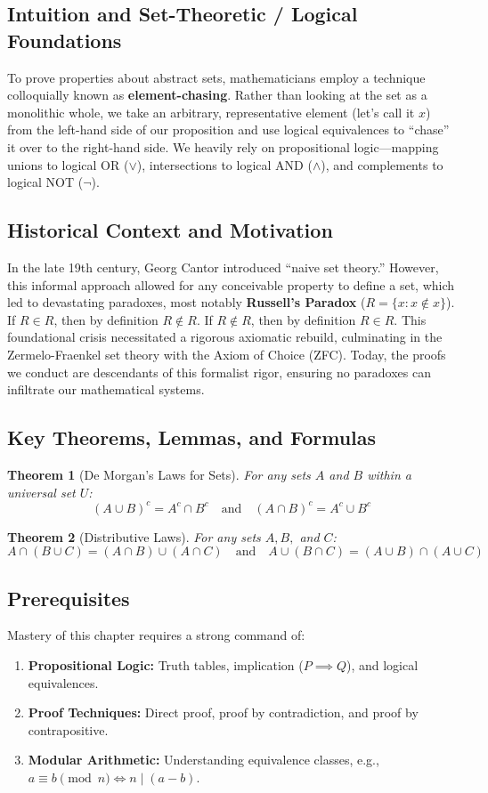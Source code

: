 \documentclass[11pt]{article}
\newtheorem{theorem}{Theorem}[section]
\begin{document}
\subsection{Intuition and Set-Theoretic / Logical Foundations}
To prove properties about abstract sets, mathematicians employ a technique colloquially known as \textbf{element-chasing}. Rather than looking at the set as a monolithic whole, we take an arbitrary, representative element (let's call it $x$) from the left-hand side of our proposition and use logical equivalences to ``chase'' it over to the right-hand side. We heavily rely on propositional logic—mapping unions to logical OR ($\lor$), intersections to logical AND ($\land$), and complements to logical NOT ($\neg$).

\subsection{Historical Context and Motivation}
In the late 19th century, Georg Cantor introduced ``naive set theory.'' However, this informal approach allowed for any conceivable property to define a set, which led to devastating paradoxes, most notably \textbf{Russell's Paradox} ($R = \{x : x \notin x\}$). If $R \in R$, then by definition $R \notin R$. If $R \notin R$, then by definition $R \in R$. This foundational crisis necessitated a rigorous axiomatic rebuild, culminating in the Zermelo-Fraenkel set theory with the Axiom of Choice (ZFC). Today, the proofs we conduct are descendants of this formalist rigor, ensuring no paradoxes can infiltrate our mathematical systems.

\subsection{Key Theorems, Lemmas, and Formulas}
\begin{theorem}[De Morgan's Laws for Sets]
For any sets $A$ and $B$ within a universal set $U$:
\[ (A \cup B)^c = A^c \cap B^c \quad \text{and} \quad (A \cap B)^c = A^c \cup B^c \]
\end{theorem}
\begin{theorem}[Distributive Laws]
For any sets $A, B,$ and $C$:
\[ A \cap (B \cup C) = (A \cap B) \cup (A \cap C) \quad \text{and} \quad A \cup (B \cap C) = (A \cup B) \cap (A \cup C) \]
\end{theorem}

\subsection{Prerequisites}
Mastery of this chapter requires a strong command of:
\begin{enumerate}
    \item \textbf{Propositional Logic:} Truth tables, implication ($P \implies Q$), and logical equivalences.
    \item \textbf{Proof Techniques:} Direct proof, proof by contradiction, and proof by contrapositive.
    \item \textbf{Modular Arithmetic:} Understanding equivalence classes, e.g., $a \equiv b \pmod n \iff n \mid (a - b)$.
\end{enumerate}
\end{document}
